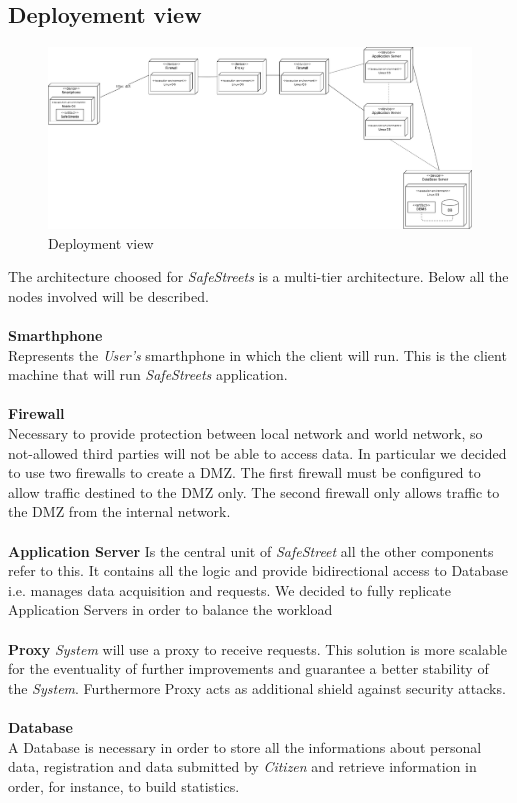 \documentclass{article}
\begin{document}
\clearpage

\subsection{Deployement view}
\begin{figure}[H]
    \centering
    \includegraphics[scale=0.4]{img/Deployment_component.png}
    \caption{Deployment view}
\end{figure}  
The architecture choosed for \textit{SafeStreets} is a multi-tier architecture. Below all the nodes 
involved will be described.
\\
\\
\textbf{Smarthphone}\\
Represents the \textit{User's} smarthphone in which the client will run. This is the client machine
that will run \textit{SafeStreets} application.
\\
\\
\textbf{Firewall}\\
Necessary to provide protection between local network and world network, so not-allowed third parties will not be 
able to access data. In particular we decided to use two firewalls to create a DMZ. The first firewall must be configured 
to allow traffic destined to the DMZ only. The second firewall only allows traffic to the DMZ from the internal network.
\\
\\
\textbf{Application Server}
Is the central unit of \textit{SafeStreet} all the other components refer to this. It contains all
the logic and provide bidirectional access to Database i.e. manages data acquisition and requests.
We decided to fully replicate Application Servers in order to balance the workload 
\\
\\
\textbf{Proxy}
\textit{System} will use a proxy to receive requests. This solution is more scalable for the eventuality
of further improvements and guarantee a better stability of the \textit{System}. Furthermore Proxy acts as
additional shield against security attacks.  
\\
\\
\textbf{Database}\\
A Database is necessary in order to store all the informations about personal data, registration and 
data submitted by \textit{Citizen} and retrieve information in order, for instance, to build statistics.
\end{document}

